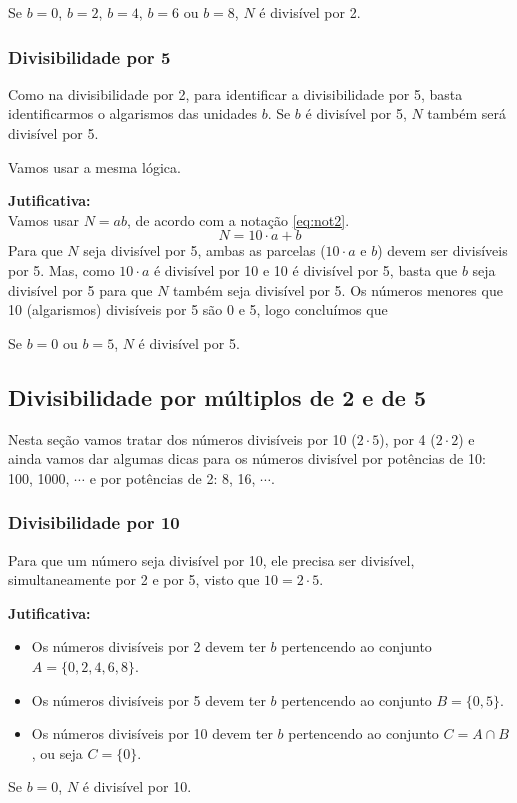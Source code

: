 \documentclass[12pt,a4paper]{article}
\begin{document}
		\begin{meudestaque}
			Se $b = 0$, $b = 2$, $b = 4$, $b = 6$ ou $b = 8$, $N$ é divisível por 2.
		\end{meudestaque}
		
		\subsubsection{Divisibilidade por 5}
		
		Como na divisibilidade por 2, para identificar a divisibilidade por 5, basta identificarmos o algarismos das unidades $b$. Se $b$ é divisível por 5, $N$ também será divisível por 5.
		
		Vamos usar a mesma lógica.
		
		\textbf{Jutificativa:}\\
		Vamos usar $N = ab$, de acordo com a notação \ref{eq:not2}.		
		$$N = 10 \cdot a + b$$		
		Para que $N$ seja divisível por 5, ambas as parcelas ($10 \cdot a$ e $b$) devem ser divisíveis por 5. Mas, como $10 \cdot a$ é divisível por 10 e 10 é divisível por 5, basta que $b$ seja divisível por 5 para que $N$ também seja divisível por 5. Os números menores que 10 (algarismos) divisíveis por 5 são 0 e 5, logo concluímos que 
		
		\begin{meudestaque}
			Se $b = 0$ ou $b = 5$, $N$ é divisível por 5.
		\end{meudestaque}
		
		\subsection{Divisibilidade por múltiplos de 2 e de 5}
		\label{sub:m2_5}
		Nesta seção vamos tratar dos números divisíveis por 10 ($2 \cdot 5$), por 4 ($2 \cdot 2$) e ainda vamos dar algumas dicas para os números divisível por potências de 10: 100, 1000, $\cdots$ e por potências de 2: 8, 16, $\cdots$.
		
		\subsubsection{Divisibilidade por 10}
		Para que um número seja divisível por 10, ele precisa ser divisível, simultaneamente por 2 e por 5, visto que $10 = 2 \cdot 5$.
		
		\textbf{Jutificativa:}
		\begin{itemize}
			\item Os números divisíveis por 2 devem ter $b$ pertencendo ao conjunto $A = \{0, 2, 4, 6, 8\}$.
			\item Os números divisíveis por 5 devem ter $b$ pertencendo ao conjunto $B = \{0, 5\}$.
			\item Os números divisíveis por 10 devem ter $b$ pertencendo ao conjunto $C = A \cap B$, ou seja $C = \{0\}$.			
		\end{itemize}
				\begin{meudestaque}
			Se $b = 0$, $N$ é divisível por 10.
		\end{meudestaque}
		
\end{document}
